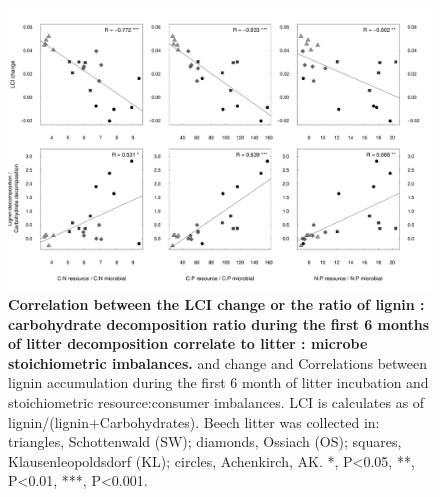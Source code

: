 \documentclass[10pt]{article}
\begin{document}
\begin{flushleft}
\newpage
\begin{figure}[h!]
\vspace*{2mm}
\begin{center}
\includegraphics{ligpaper-graphcorr}
\end{center}
\caption{
{\bf Correlation between the LCI change or the ratio of lignin : carbohydrate decomposition ratio during the first 6 months of litter decomposition correlate to litter : microbe stoichiometric imbalances.} and change and Correlations between lignin accumulation during the first 6 month of litter incubation and stoichiometric resource:consumer imbalances. LCI is calculates as of lignin/(lignin+Carbohydrates).  Beech litter was collected in: triangles, Schottenwald (SW); diamonds, Ossiach (OS); squares, Klausenleopoldsdorf (KL); circles, Achenkirch, AK. *, P\textless 0.05, **, P\textless 0.01, ***, P\textless 0.001.}
\label{fig:cor1}
\end{figure}




\end{flushleft}
\end{document}
